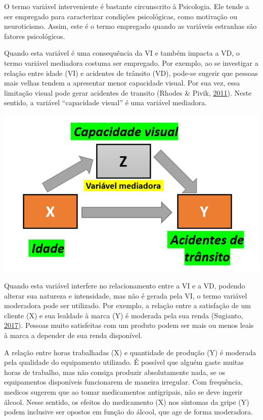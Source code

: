 \documentclass[
]{book}
\begin{document}
O termo variável interveniente é bastante circunscrito à Psicologia. Ele
tende a ser empregado para caracterizar condições psicológicas, como
motivação ou neuroticismo. Assim, este é o termo empregado quando as
variáveis estranhas são fatores psicológicos.

Quando esta variável é uma consequência da VI e também impacta a VD, o
termo variável mediadora costuma ser empregado. Por exemplo, ao se
investigar a relação entre idade (VI) e acidentes de trânsito (VD),
pode-se sugerir que pessoas mais velhas tendem a apresentar menor
capacidade visual. Por sua vez, essa limitação visual pode gerar
acidentes de transito (Rhodes \& Pivik,
\protect\hyperlink{ref-Rhodes2011}{2011}). Neste sentido, a variável
``capacidade visual'' é uma variável mediadora.

\includegraphics{./img/cap_mediacao.png}

Quando esta variável interfere no relacionamento entre a VI e a VD,
podendo alterar sua natureza e intensidade, mas não é gerada pela VI, o
termo variável moderadora pode ser utilizado. Por exemplo, a relação
entre a satisfação de um cliente (X) e sua lealdade à marca (Y) é
moderada pela sua renda (Sugianto,
\protect\hyperlink{ref-Sugianto2017}{2017}). Pessoas muito satisfeitas
com um produto podem ser mais ou menos leais à marca a depender de sua
renda disponível.

A relação entre horas trabalhadas (X) e quantidade de produção (Y) é
moderada pela qualidade do equipamento utilizado. É possível que alguém
gaste muitas horas de trabalho, mas não consiga produzir absolutamente
nada, se os equipamentos disponíveis funcionarem de maneira irregular.
Com frequência, medicos sugerem que ao tomar medicamentos antigripais,
não se deve ingerir álcool. Nesse sentido, os efeitos do medicamento (X)
nos sintomas da gripe (Y) podem inclusive ser opostos em função do
álcool, que age de forma moderadora.
\end{document}
